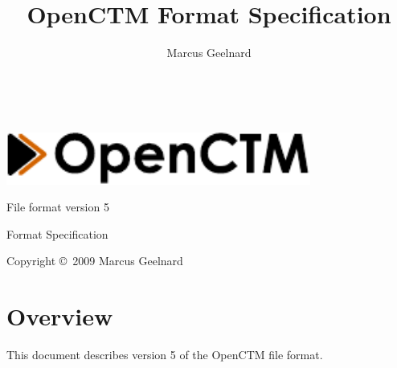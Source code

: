 %
%



\author{Marcus Geelnard}
\title{OpenCTM Format Specification}




\begin{titlepage}
\begin{center}
~
\vspace{5cm}

\includegraphics[width=10.0cm]{logo.pdf}
\vspace{0.4cm}

{\large File format version 5}

\vspace{1.0cm}

{\Large Format Specification}
\vspace{1.5cm}

Copyright \copyright \ 2009 Marcus Geelnard
\end{center}
\end{titlepage}



\tableofcontents



\chapter{Overview}
This document describes version 5 of the OpenCTM file format.

